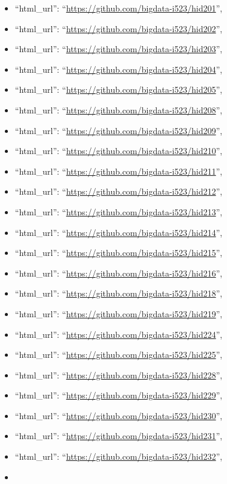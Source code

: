 \begin{itemize}
\item
  ``html\_url'': ``\url{https://github.com/bigdata-i523/hid201}'',
\item
  ``html\_url'': ``\url{https://github.com/bigdata-i523/hid202}'',
\item
  ``html\_url'': ``\url{https://github.com/bigdata-i523/hid203}'',
\item
  ``html\_url'': ``\url{https://github.com/bigdata-i523/hid204}'',
\item
  ``html\_url'': ``\url{https://github.com/bigdata-i523/hid205}'',
\item
  ``html\_url'': ``\url{https://github.com/bigdata-i523/hid208}'',
\item
  ``html\_url'': ``\url{https://github.com/bigdata-i523/hid209}'',
\item
  ``html\_url'': ``\url{https://github.com/bigdata-i523/hid210}'',
\item
  ``html\_url'': ``\url{https://github.com/bigdata-i523/hid211}'',
\item
  ``html\_url'': ``\url{https://github.com/bigdata-i523/hid212}'',
\item
  ``html\_url'': ``\url{https://github.com/bigdata-i523/hid213}'',
\item
  ``html\_url'': ``\url{https://github.com/bigdata-i523/hid214}'',
\item
  ``html\_url'': ``\url{https://github.com/bigdata-i523/hid215}'',
\item
  ``html\_url'': ``\url{https://github.com/bigdata-i523/hid216}'',
\item
  ``html\_url'': ``\url{https://github.com/bigdata-i523/hid218}'',
\item
  ``html\_url'': ``\url{https://github.com/bigdata-i523/hid219}'',
\item
  ``html\_url'': ``\url{https://github.com/bigdata-i523/hid224}'',
\item
  ``html\_url'': ``\url{https://github.com/bigdata-i523/hid225}'',
\item
  ``html\_url'': ``\url{https://github.com/bigdata-i523/hid228}'',
\item
  ``html\_url'': ``\url{https://github.com/bigdata-i523/hid229}'',
\item
  ``html\_url'': ``\url{https://github.com/bigdata-i523/hid230}'',
\item
  ``html\_url'': ``\url{https://github.com/bigdata-i523/hid231}'',
\item
  ``html\_url'': ``\url{https://github.com/bigdata-i523/hid232}'',
\item

\end{itemize}
